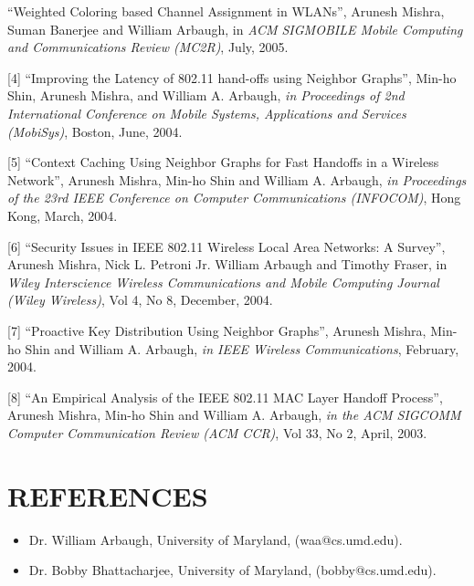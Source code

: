 \begin{resume}
[3] ``Weighted Coloring based Channel Assignment in WLANs'', Arunesh Mishra, Suman Banerjee and William Arbaugh,
in {\em ACM SIGMOBILE Mobile Computing and Communications Review (MC2R)}, July, 2005.



[4] ``Improving the Latency of 802.11 hand-offs using Neighbor Graphs'', Min-ho Shin, Arunesh Mishra, and William A. Arbaugh,
{\em in Proceedings of 2nd International Conference on Mobile Systems, Applications and Services (MobiSys)}, Boston, June, 2004.


[5] ``Context Caching Using Neighbor Graphs for Fast Handoffs in a Wireless Network'', Arunesh Mishra, 
Min-ho Shin and William A. Arbaugh, {\em in Proceedings of the 23rd IEEE Conference on
 Computer Communications (INFOCOM)}, Hong Kong, March, 2004.

[6] ``Security Issues in IEEE 802.11 Wireless Local Area Networks: A Survey'', Arunesh Mishra, Nick L. Petroni Jr. William Arbaugh and Timothy Fraser, 
in {\em  Wiley Interscience Wireless Communications and Mobile Computing Journal (Wiley Wireless)}, Vol 4, No 8, December, 2004.

[7] ``Proactive Key Distribution Using Neighbor Graphs'', Arunesh Mishra,  Min-ho Shin and William A. Arbaugh,
{\em in IEEE Wireless Communications}, February, 2004. 

[8] ``An Empirical Analysis of the IEEE 802.11 MAC Layer Handoff Process'', Arunesh Mishra,  
Min-ho Shin and William A. Arbaugh, {\em in the ACM SIGCOMM Computer Communication Review (ACM CCR)},
Vol 33, No 2, April, 2003. 


\section{REFERENCES}
   \begin{itemize}
        \item[] Dr. William Arbaugh, University of Maryland, (waa@cs.umd.edu).
	\item [] Dr. Bobby Bhattacharjee, University of Maryland, (bobby@cs.umd.edu).
   \end{itemize}
\end{resume}































